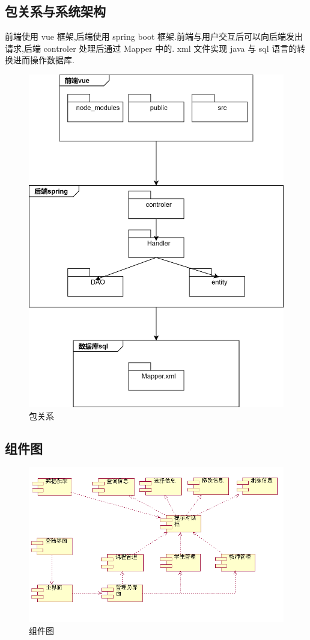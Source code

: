 \documentclass[12pt, a4paper]{article}
\begin{document}
\subsection{包关系与系统架构}
前端使用 vue 框架,后端使用 spring boot 框架.前端与用户交互后可以向后端发出请求,后端 controler 处理后通过 Mapper 中的.
xml 文件实现 java 与 sql 语言的转换进而操作数据库.
\begin{figure}[H]
	\centering
	\includegraphics[width = 0.8 \textwidth]{package.png}
	\caption{包关系}
\end{figure}

\subsection{组件图}
\begin{figure}[H]
	\centering
	\includegraphics[width = 0.8 \textwidth]{component.png}
	\caption{组件图}
\end{figure}
\end{document}
